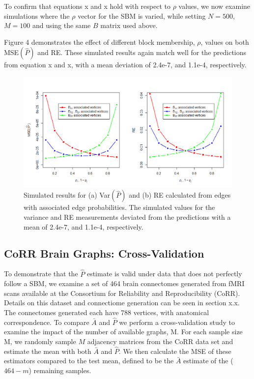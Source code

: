 To confirm that equations x and x hold with respect to $\rho$ values, we now examine simulations where the $\rho$ vector for the SBM is varied, while setting $N = 500$, $M = 100$ and using the same $B$ matrix used above.


Figure 4 demonstrates the effect of different block membership, $\rho$, values on both MSE$(\hat{P})$ and RE.  These simulated results again match well for the predictions from equation x and x, with a mean deviation of 2.4e-7, and 1.1e-4, respectively.
\begin{figure}[!htb]
	\centering
	\includegraphics[width=14cm]{VarRE.PNG}
	\caption{Simulated results for (a) Var$(\hat{P})$ and (b) RE calculated from edges with associated edge probabilities. The simulated values for the variance and RE measurements deviated from the predictions with a mean of 2.4e-7, and 1.1e-4, respectively.}
	\label{fig:plot1}
\end{figure}
\subsection{CoRR Brain Graphs: Cross-Validation}
	
	To demonstrate that the $\hat{P}$ estimate is valid under data that does not perfectly follow a SBM, we examine a set of 464 brain connectomes generated from fMRI scans available at the Consortium for Reliability and Reproducibility (CoRR).  Details on this dataset and connectiome generation can be seen in section x.x.  The connectomes generated each have 788 vertices, with anatomical correspondence. To compare $\bar{A}$ and $\hat{P}$ we perform a cross-validation study to examine the impact of the number of available graphs, M.  For each sample size M, we randomly sample $M$ adjacency matrices from the CoRR data set and estimate the mean with both $\bar{A}$ and $\hat{P}$.  We then calculate the MSE of these estimators compared to the test mean, defined to be the $\bar{A}$ estimate of the ($464-m$) remaining samples.
	
